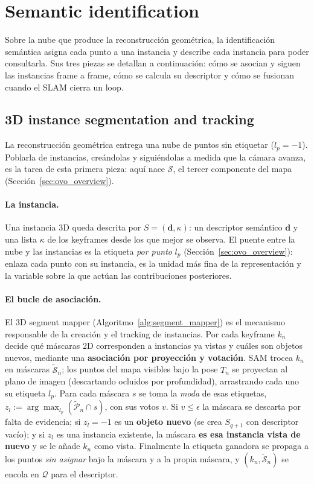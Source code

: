 \section{Semantic identification}
\label{sec:ovo_semantic}

Sobre la nube que produce la reconstrucción geométrica, la identificación semántica asigna cada punto
a una instancia y describe cada instancia para poder consultarla. Sus tres piezas se detallan a
continuación: cómo se asocian y siguen las instancias frame a frame, cómo se calcula su descriptor
y cómo se fusionan cuando el SLAM cierra un loop.

\subsection{3D instance segmentation and tracking}
\label{sec:ovo_segment_mapper}

La reconstrucción geométrica entrega una nube de puntos sin etiquetar ($l_p = -1$). Poblarla de
instancias, creándolas y siguiéndolas a medida que la cámara avanza, es la tarea de esta primera
pieza: aquí nace $\mathcal{S}$, el tercer componente del mapa (Sección~\ref{sec:ovo_overview}).

\paragraph{La instancia.} Una instancia 3D queda descrita por $S = (\mathbf{d}, \kappa)$: un
descriptor semántico $\mathbf{d}$ y una lista $\kappa$ de los keyframes desde los que mejor se
observa. El puente entre la nube y las instancias es la etiqueta \emph{por punto} $l_p$
(Sección~\ref{sec:ovo_overview}): enlaza cada punto con su instancia, es la unidad más fina de la
representación y la variable sobre la que actúan las contribuciones posteriores.

\paragraph{El bucle de asociación.} El 3D segment mapper (Algoritmo~\ref{alg:segment_mapper}) es el
mecanismo responsable de la creación y el tracking de instancias. Por cada keyframe $k_n$ decide qué
máscaras 2D corresponden a instancias ya vistas y cuáles son objetos nuevos, mediante una
\textbf{asociación por proyección y votación}. SAM trocea $k_n$ en máscaras
$\tilde{\mathcal{S}}_n$; los puntos del mapa visibles bajo la pose $T_n$ se proyectan al plano de
imagen (descartando ocluidos por profundidad), arrastrando cada uno su etiqueta $l_p$. Para cada
máscara $s$ se toma la \emph{moda} de esas etiquetas, $z_l := \arg\max_{l_p}
(\tilde{\mathcal{P}}_n \cap s)$, con sus votos $v$. Si $v \le \epsilon$ la máscara se descarta por
falta de evidencia; si $z_l = -1$ es un \textbf{objeto nuevo} (se crea $S_{q+1}$ con descriptor
vacío); y si $z_l$ es una instancia existente, la máscara \textbf{es esa instancia vista de nuevo}
y se le añade $k_n$ como vista. Finalmente la etiqueta ganadora se propaga a los puntos
\emph{sin asignar} bajo la máscara y a la propia máscara, y $(k_n, \tilde{\mathcal{S}}_n)$ se
encola en $\mathcal{Q}$ para el descriptor.


